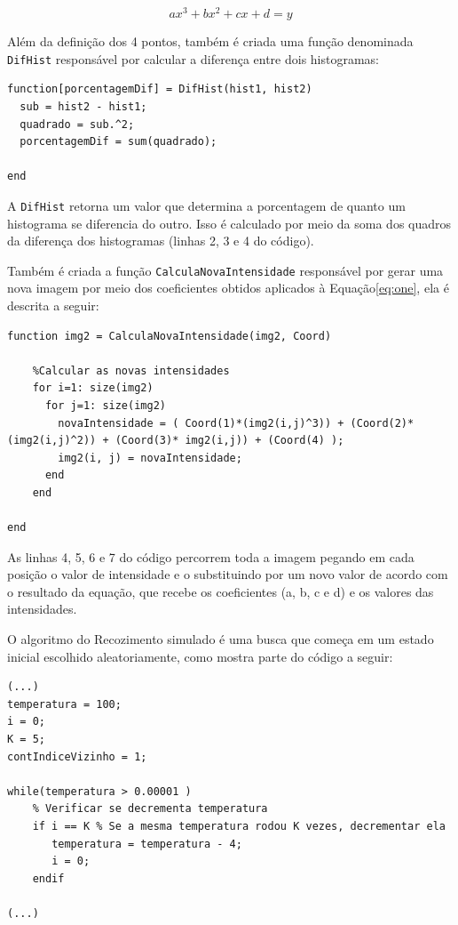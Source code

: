 \begin{equation}
 ax^3+bx^2+cx+d=y
\label{eq:one}
\end{equation}
 
Além da definição dos 4 pontos, também é criada uma função denominada \texttt{DifHist} responsável por calcular a diferença entre dois histogramas:

\begin{lstlisting}[style=Matlab-editor]
function[porcentagemDif] = DifHist(hist1, hist2)
  sub = hist2 - hist1;
  quadrado = sub.^2;
  porcentagemDif = sum(quadrado);
 
end
\end{lstlisting}

A \texttt{DifHist} retorna um valor que determina a porcentagem de quanto um histograma se diferencia do outro. Isso é calculado por meio da soma dos quadros da diferença dos histogramas (linhas 2, 3 e 4 do código).

Também é criada a função \texttt{CalculaNovaIntensidade} responsável por gerar uma nova imagem por meio dos coeficientes obtidos aplicados à Equação\ref{eq:one}, ela é descrita a seguir:

\begin{lstlisting}[style=Matlab-editor]
function img2 = CalculaNovaIntensidade(img2, Coord)
    
    %Calcular as novas intensidades
    for i=1: size(img2)
      for j=1: size(img2)
        novaIntensidade = ( Coord(1)*(img2(i,j)^3)) + (Coord(2)*(img2(i,j)^2)) + (Coord(3)* img2(i,j)) + (Coord(4) );
        img2(i, j) = novaIntensidade;
      end
    end
    
end 
\end{lstlisting}
 As linhas 4, 5, 6 e 7 do código percorrem toda a imagem pegando em cada posição o valor de intensidade e o substituindo por um novo valor de acordo com o resultado da equação, que recebe os coeficientes (a, b, c e d) e os valores das intensidades.

O algoritmo do Recozimento simulado é uma busca que começa em um estado inicial escolhido aleatoriamente, como mostra parte do código a seguir:

\begin{lstlisting}[style=Matlab-editor]
(...)
temperatura = 100;
i = 0;
K = 5;
contIndiceVizinho = 1;
   
while(temperatura > 0.00001 )    
    % Verificar se decrementa temperatura
    if i == K % Se a mesma temperatura rodou K vezes, decrementar ela
       temperatura = temperatura - 4;
       i = 0;
    endif

(...)
        
\end{lstlisting}

